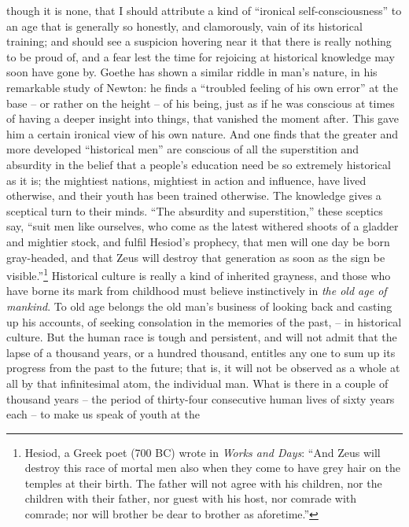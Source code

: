  though it is none, that I should attribute a
kind of \enquote{ironical self-consciousness} to an age that is generally so
honestly, and clamorously, vain of its historical training; and
should see a suspicion hovering near it that there is really nothing
to be proud of, and a fear lest the time for rejoicing at historical
knowledge may soon have gone by. Goethe has shown a similar riddle in
man's nature, in his remarkable study of Newton: he finds a \enquote{troubled
feeling of his own error} at the base -- or rather on the height -- of
his being, just as if he was conscious at times of having a deeper
insight into things, that vanished the moment after. This gave him a
certain ironical view of his own nature. And one finds that the
greater and more developed \enquote{historical men} are conscious of all the
superstition and absurdity in the belief that a people's education
need be so extremely historical as it is; the mightiest nations,
mightiest in action and influence, have lived otherwise, and their
youth has been trained otherwise. The knowledge gives a sceptical
turn to their minds. \enquote{The absurdity and superstition,} these sceptics
say, \enquote{suit men like ourselves, who come as the latest withered shoots
of a gladder and mightier stock, and fulfil Hesiod's prophecy, that
men will one day be born gray-headed, and that Zeus will destroy that
generation as soon as the sign be visible.}\footnote{Hesiod, a Greek poet (700 BC) wrote in \textit{Works and Days}: \enquote{And Zeus will destroy this race of mortal men also when they come to have grey hair on the temples at their birth. The father will not agree with his children, nor the children with their father, nor guest with his host, nor comrade with comrade; nor will brother be dear to brother as aforetime.}} Historical culture is
really a kind of inherited grayness, and those who have borne its
mark from childhood must believe instinctively in \textit{the old age of
mankind}. To old age belongs the old man's business of looking back
and casting up his accounts, of seeking consolation in the memories
of the past, -- in historical culture. But the human race is tough and
persistent, and will not admit that the lapse of a thousand years, or
a hundred thousand, entitles any one to sum up its progress from the
past to the future; that is, it will not be observed as a whole at
all by that infinitesimal atom, the individual man. What is there in
a couple of thousand years -- the period of thirty-four consecutive
human lives of sixty years each -- to make us speak of youth at the
